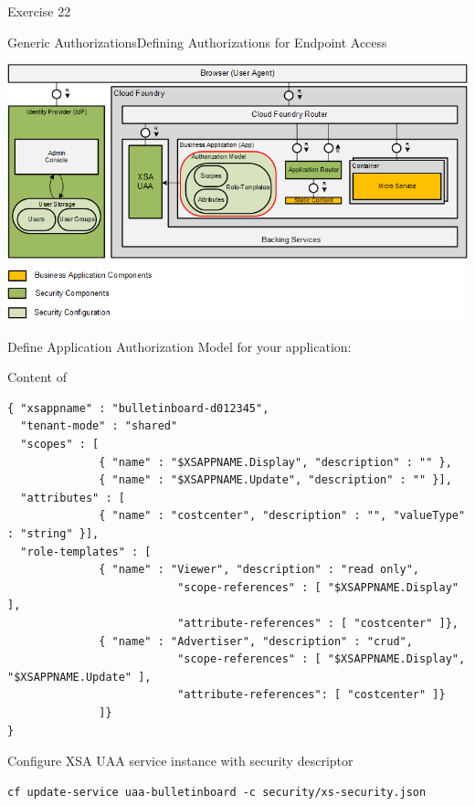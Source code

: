 \begin{frame}{Exercise 22}
	\begin{figure}
	\end{figure}
\end{frame}


\begin{frame}{Generic Authorizations}{Defining Authorizations for Endpoint Access}
\centerline{\includegraphics[width=1\textwidth]{../Security/images/XSA-Overview-Authorization}}
\end{frame}


\begin{frame}[fragile,t]{Define Application Authorization Model}
 for your application:
\begin{block}{Content of }
\vspace{-3mm}
	\tiny
	\begin{lstlisting}[style=json]
{ "xsappname" : "bulletinboard-d012345",
  "tenant-mode" : "shared"
  "scopes" : [
              { "name" : "$XSAPPNAME.Display", "description" : "" },
              { "name" : "$XSAPPNAME.Update", "description" : "" }],
  "attributes" : [
              { "name" : "costcenter", "description" : "", "valueType" : "string" }],
  "role-templates" : [
              { "name" : "Viewer", "description" : "read only",
                          "scope-references" : [ "$XSAPPNAME.Display" ],
                          "attribute-references" : [ "costcenter" ]},
              { "name" : "Advertiser", "description" : "crud", 
                          "scope-references" : [ "$XSAPPNAME.Display", "$XSAPPNAME.Update" ],
                          "attribute-references": [ "costcenter" ]}
              ]}
}
	\end{lstlisting}
	\vspace{-5mm}
\end{block}
\vfill
Configure XSA UAA service instance with security descriptor
\scriptsize
\begin{lstlisting}
cf update-service uaa-bulletinboard -c security/xs-security.json
\end{lstlisting}
\end{frame}



